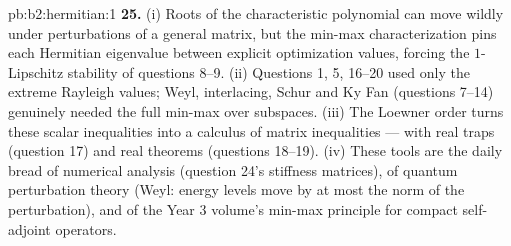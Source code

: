\begin{solution}{pb:b2:hermitian:1}
\textbf{25.} (i) Roots of the characteristic polynomial can
move wildly under perturbations of a general matrix, but the
min-max characterization pins each Hermitian eigenvalue between
explicit optimization values, forcing the $1$-Lipschitz
stability of questions 8--9. (ii) Questions 1, 5, 16--20 used
only the extreme Rayleigh values; Weyl, interlacing, Schur and
Ky Fan (questions 7--14) genuinely needed the full min-max
over subspaces. (iii) The Loewner order turns these scalar
inequalities into a calculus of matrix inequalities --- with
real traps (question 17) and real theorems (questions 18--19).
(iv) These tools are the daily bread of numerical analysis
(question 24's stiffness matrices), of quantum perturbation
theory (Weyl: energy levels move by at most the norm of the
perturbation), and of the Year 3 volume's min-max principle
for compact self-adjoint operators.
\end{solution}
